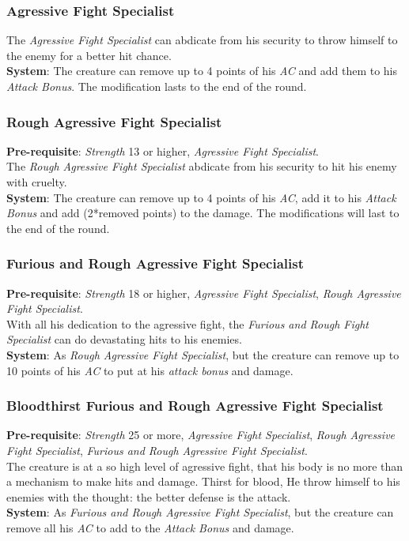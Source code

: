 \documentclass[ letterpaper,12pt]{article}
\begin{document}
\subsubsection{Agressive Fight Specialist}
The {\it Agressive Fight Specialist} can abdicate from his security to throw himself to the enemy for a better hit chance.\\
{\bf System}: The creature can remove up to 4 points of his {\it AC} and add them to his {\it Attack Bonus}. The modification lasts to the end of the round.

\subsubsection{Rough Agressive Fight Specialist}
{\bf Pre-requisite}: {\it Strength} 13 or higher, {\it Agressive Fight Specialist}.\\
The {\it Rough Agressive Fight Specialist} abdicate from his security to hit his enemy with cruelty.\\
{\bf System}: The creature can remove up to 4 points of his {\it AC}, add it to his {\it Attack Bonus} and add (2*removed points) to the damage. The modifications will last to the end of the round.

\subsubsection{Furious and Rough Agressive Fight Specialist}
{\bf Pre-requisite}: {\it Strength} 18 or higher, {\it Agressive Fight Specialist}, {\it Rough Agressive Fight Specialist}.\\
With all his dedication to the agressive fight, the {\it Furious and Rough Fight Specialist} can do devastating hits to his enemies.\\
{\bf System}: As {\it Rough Agressive Fight Specialist}, but the creature can remove up to 10 points of his {\it AC} to put at his {\it attack bonus} and damage.

\subsubsection{Bloodthirst Furious and Rough Agressive Fight Specialist}
{\bf Pre-requisite}: {\it Strength} 25 or more, {\it Agressive Fight Specialist}, {\it Rough Agressive Fight Specialist}, {\it Furious and Rough Agressive Fight Specialist}.\\
The creature is at a so high level of agressive fight, that his body is no more than a mechanism to make hits and damage. Thirst for blood, He throw himself to his enemies with the thought: the better defense is the attack.\\
{\bf System}: As {\it Furious and Rough Agressive Fight Specialist}, but the creature can remove all his {\it AC} to add to the {\it Attack Bonus} and damage.
\end{document}
